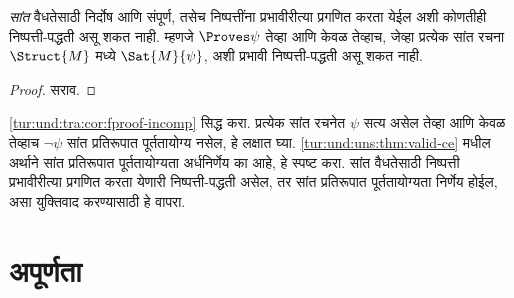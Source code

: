 \begin{cor}\label{tur:und:tra:cor:fproof-incomp}
  \emph{सांत} वैधतेसाठी
  निर्दोष आणि संपूर्ण, तसेच निष्पत्तींना
  प्रभावीरीत्या प्रगणित करता येईल अशी
  कोणतीही निष्पत्ती-पद्धती असू शकत नाही.
  म्हणजे $\Proves \psi$ तेव्हा आणि केवळ तेव्हाच,
  जेव्हा प्रत्येक सांत रचना~$\Struct{M}$ मध्ये $\Sat{M}{\psi}$,
  अशी प्रभावी निष्पत्ती-पद्धती असू शकत नाही.

\end{cor}

\begin{proof}
  सराव.
\end{proof}

\begin{prob}
  \ref{tur:und:tra:cor:fproof-incomp}
  सिद्ध करा. प्रत्येक
  सांत रचनेत $\psi$ सत्य
  असेल तेव्हा आणि केवळ तेव्हाच
  $\lnot \psi$ सांत प्रतिरूपात
  पूर्ततायोग्य नसेल,
  हे लक्षात घ्या.
  \ref{tur:und:uns:thm:valid-ce}
  मधील अर्थाने सांत
  प्रतिरूपात पूर्ततायोग्यता अर्धनिर्णेय
  का आहे, हे स्पष्ट
  करा. सांत वैधतेसाठी
  निष्पत्ती प्रभावीरीत्या प्रगणित करता येणारी
  निष्पत्ती-पद्धती
  असेल, तर सांत
  प्रतिरूपात पूर्ततायोग्यता निर्णेय
  होईल, असा युक्तिवाद
  करण्यासाठी हे वापरा.
\end{prob}




\part{अपूर्णता}
